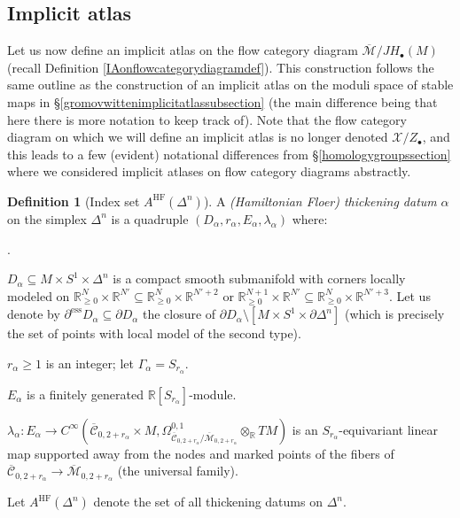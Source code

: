 \documentclass[12pt]{article}
\theoremstyle{definition}
\newtheorem{definition}[theorem]{Definition}
\theoremstyle{remark}
\numberwithin{equation}{subsection}
\newcommand{\X}{\mathcal X}
\newcommand{\RR}{\mathbb R}
\newcommand{\Mbar}{\overline{\mathcal M}}
\newcommand{\Cbar}{\overline{\mathcal C}}
\newcommand{\ess}{\mathrm{ess}}
\newcommand{\HF}{\mathrm{HF}}
\newcommand{\JH}{J\!H}
\newcounter{rcounti}
\newenvironment{rlist}{\begin{list}{\roman{rcounti}.}{\usecounter{rcounti}
\setlength\itemsep{0pt}
\setlength\labelsep{4pt}
\setlength\labelwidth{16pt}
\setlength\leftmargin{32pt}
\setlength\listparindent{0pt}
\setlength\parsep{0pt}
\setlength\parskip{0pt}
\setlength\partopsep{0pt}
\setlength\rightmargin{0pt}
\setlength\topsep{0pt}
\setlength\itemindent{0pt}
}}{\end{list}}
\begin{document}
\subsection{Implicit atlas}\label{HFIAsubsec}

Let us now define an implicit atlas on the flow category diagram $\Mbar/\JH_\bullet(M)$ (recall Definition \ref{IAonflowcategorydiagramdef}).  This construction follows the same outline as the construction of an implicit atlas on the moduli space of stable maps in \S\ref{gromovwittenimplicitatlassubsection} (the main difference being that here there is more notation to keep track of).  Note that the flow category diagram on which we will define an implicit atlas is no longer denoted $\X/Z_\bullet$, and this leads to a few (evident) notational differences from \S\ref{homologygroupssection} where we considered implicit atlases on flow category diagrams abstractly.

\begin{definition}[Index set $A^\HF(\Delta^n)$]\label{implicitatlasonFloer}
A \emph{(Hamiltonian Floer) thickening datum} $\alpha$ on the simplex $\Delta^n$ is a quadruple $(D_\alpha,r_\alpha,E_\alpha,\lambda_\alpha)$ where:
\begin{rlist}
\item\label{implicitatlasFloerD}$D_\alpha\subseteq M\times S^1\times\Delta^n$ is a compact smooth submanifold with corners locally modeled on $\RR_{\geq 0}^N\times\RR^{N'}\subseteq\RR_{\geq 0}^N\times\RR^{N'+2}$ or $\RR_{\geq 0}^{N+1}\times\RR^{N'}\subseteq\RR_{\geq 0}^N\times\RR^{N'+3}$.  Let us denote by $\partial^\ess D_\alpha\subseteq\partial D_\alpha$ the closure of $\partial D_\alpha\setminus[M\times S^1\times\partial\Delta^n]$ (which is precisely the set of points with local model of the second type).
\item$r_\alpha\geq 1$ is an integer; let $\Gamma_\alpha=S_{r_\alpha}$.
\item$E_\alpha$ is a finitely generated $\RR[S_{r_\alpha}]$-module.
\item$\lambda_\alpha:E_\alpha\to C^\infty(\Cbar_{0,2+r_\alpha}\times M,\Omega^{0,1}_{\Cbar_{0,2+r_\alpha}/\Mbar_{0,2+r_\alpha}}\otimes_\RR TM)$ is an $S_{r_\alpha}$-equivariant linear map supported away from the nodes and marked points of the fibers of $\Cbar_{0,2+r_\alpha}\to\Mbar_{0,2+r_\alpha}$ (the universal family).
\end{rlist}
Let $A^\HF(\Delta^n)$ denote the set of all thickening datums on $\Delta^n$.
\end{definition}
\end{document}
